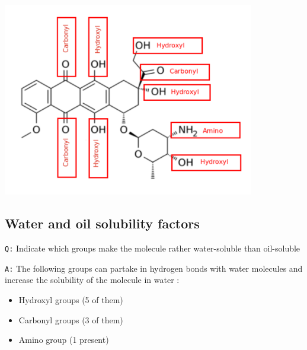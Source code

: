 \documentclass[11pt, a4paper,titlepage]{article}
\begin{document}
\includegraphics[width=11cm]{./Figures/Part3MoleculeFunctionalGroups.pdf}
\subsection{Water and oil solubility factors}
\label{sec-3-2}

\texttt{Q:} Indicate which groups make the molecule rather water-soluble
than oil-soluble

\texttt{A:} The following groups can partake in hydrogen bonds with water
molecules and increase the solubility of the molecule in water :

\begin{itemize}
\item Hydroxyl groups (5 of them)
\item Carbonyl groups (3 of them)
\item Amino group (1 present)
\end{itemize}




\end{document}
